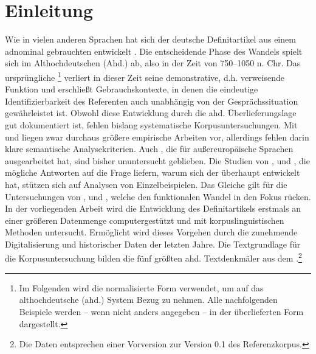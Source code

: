 \chapter{Einleitung}

Wie in vielen anderen Sprachen hat sich der deutsche Definitartikel aus einem adnominal gebrauchten  entwickelt  \parencite{Oubouzar1992,Szczepaniak2011a}. Die entscheidende Phase des Wandels spielt sich im Althochdeutschen (Ahd.) ab, also in der Zeit von 750--1050 n. Chr. Das ursprüngliche   \footnote{Im Folgenden wird die normalisierte Form  verwendet, um auf das althochdeutsche (ahd.) System Bezug zu nehmen. Alle nachfolgenden Beispiele werden -- wenn nicht anders angegeben -- in der überlieferten Form dargestellt.} verliert in dieser Zeit seine demonstrative, d.h. verweisende Funktion und erschließt Gebrauchskontexte, in denen die eindeutige Identifizierbarkeit des Referenten auch unabhängig von der Gesprächssituation gewährleistet ist. Obwohl diese Entwicklung durch die ahd. Überlieferungslage gut dokumentiert ist, fehlen bislang systematische Korpusuntersuchungen.  Mit \textcite{Hodler1954} und \textcite{Oubouzar1989,Oubouzar1992,Oubouzar1997a} liegen zwar durchaus größere empirische Arbeiten vor, allerdings fehlen darin klare semantische Analysekriterien. Auch  \parencite{Heine2002a}, die \textcite{Himmelmann1997} für außereuropäische Sprachen ausgearbeitet hat, sind bisher ununtersucht geblieben. Die Studien von \textcite{Abraham1997}, \textcite{Philippi1997} und \textcite{Leiss2000}, die mögliche Antworten auf die Frage liefern, warum sich der  überhaupt entwickelt hat, stützen sich auf Analysen von Einzelbeispielen. Das Gleiche gilt für die Untersuchungen von \textcite{Demske2001}, \textcite{Kraiss2012,Kraiss2014} und \textcite{Schlachter2015}, welche den funktionalen Wandel in den Fokus rücken.
In der vorliegenden Arbeit wird die Entwicklung des Definitartikels  erstmals an einer größeren Datenmenge computergestützt und mit korpuslinguistischen Methoden  untersucht. Ermöglicht wird dieses Vorgehen durch die zunehmende Digitalisierung und  historischer Daten der letzten Jahre. Die Textgrundlage für die Korpusuntersuchung  bilden die fünf größten ahd. Textdenkmäler aus dem   \parencite{Donhauser2014}.\footnote{Die Daten entsprechen einer Vorversion zur Version 0.1 des Referenzkorpus.} 

